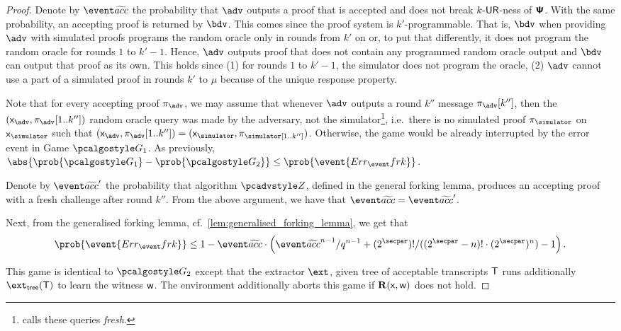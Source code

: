 \begin{proof}
Denote by $\waccProb$ the probability that $\advse$ outputs a proof that is accepted
and does not break ${k\text{-}\mathsf{UR}}$-ness of $\bm{\mathsf{\Psi}}$. With the same probability, an accepting
proof is returned by $\bdv$. This comes since the proof system is
$k'$-programmable. That is, $\bdv$ when providing $\adv$ with simulated proofs
programs the random oracle only in rounds from $k'$ on or, to put that differently,
it does not program the random oracle for rounds $1$ to $k' - 1$.  Hence, $\adv$
outputs proof that does not contain any programmed random oracle output and $\bdv$
can output that proof as its own. This holds since (1) for rounds $1$ to $k' - 1$,
the simulator does not program the oracle, (2) $\adv$ cannot use a part of a
simulated proof in rounds $k'$ to $\mu$ because of the unique response property.
	
		Note that for every accepting proof $\zkproof_{\advse}$, we may
		assume that whenever $\advse$ outputs a round $k''$ message $\zkproof_{\advse}[k'']$, then the
		$(\inp_{\advse}, \zkproof_{\advse}[1..k''])$ random oracle query was made by the adversary, not
		the simulator\footnote{\cite{INDOCRYPT:FKMV12} calls these queries \emph{fresh}.}, i.e.~there
		is no simulated proof $\zkproof_\simulator$ on $\inp_\simulator$ such that
		$(\inp_{\advse}, \zkproof_{\advse} [1..k'']) = (\inp_\simulator,
		\zkproof_\simulator[1..k''])$. Otherwise, the game would be already interrupted by the error
		event in Game $\game{1}$.  As previously,
		\( \abs{\prob{\game{1}} - \prob{\game{2}}} \leq \prob{\event{\errfrk}}\,.  \)
		

    Denote by $\waccProb'$ the probability that algorithm $\zdv$, defined in the general forking lemma,
		produces an accepting proof with a fresh challenge after round $k''$. From the above argument,
		we have that $\waccProb = \waccProb'$.
		
		Next, from the generalised forking lemma, cf.~\cref{lem:generalised_forking_lemma}, we get that
		\begin{equation}
		\begin{split}
		\prob{\event{\errfrk}} \leq 1 - \waccProb \cdot \left(\infrac{\waccProb^{n -
				1}}{q^{n - 1}} + \infrac{(2^\secpar) !}{((2^\secpar - n)! \cdot
			(2^\secpar)^{n})} - 1\right).
		\end{split}
		\end{equation}
	
    This game is identical to $\game{2}$ except that the extractor $\ext$, given tree
    of acceptable transcripts $\mathsf{T}$ runs additionally $\extt (\tree)$ to learn the
    witness $\mathsf{w}$. The environment additionally aborts this game if $\mathbf{R}(\mathsf{x},
    \mathsf{w})$ does not hold.
	

\end{proof}
